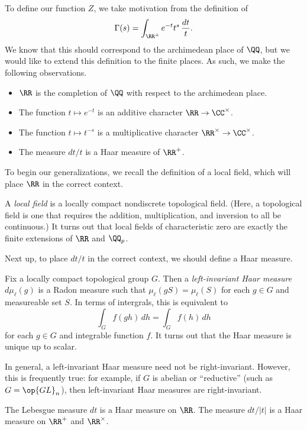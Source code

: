 \documentclass{article}
\begin{document}
To define our function $Z$, we take motivation from the definition of
\[\Gamma(s)=\int_{\RR^+}e^{-t}t^s\,\frac{dt}t.\]
We know that this should correspond to the archimedean place of $\QQ$, but we would like to extend this definition to the finite places. As such, we make the following observations.
\begin{itemize}
	\item $\RR$ is the completion of $\QQ$ with respect to the archimedean place.
	\item The function $t\mapsto e^{-t}$ is an additive character $\RR\to\CC^\times$.
	\item The function $t\mapsto t^{-s}$ is a multiplicative character $\RR^\times\to\CC^\times$.
	\item The measure $dt/t$ is a Haar measure of $\RR^+$.
\end{itemize}
To begin our generalizations, we recall the definition of a local field, which will place $\RR$ in the correct context.
\begin{definition}
	A \textit{local field} is a locally compact nondiscrete topological field. (Here, a topological field is one that requires the addition, multiplication, and inversion to all be continuous.) It turns out that local fields of characteristic zero are exactly the finite extensions of $\RR$ and $\QQ_p$.
\end{definition}
Next up, to place $dt/t$ in the correct context, we should define a Haar measure.
\begin{definition}
	Fix a locally compact topological group $G$. Then a \textit{left-invariant Haar measure} $d\mu_\ell(g)$ is a Radon measure such that $\mu_\ell(gS)=\mu_\ell(S)$ for each $g\in G$ and measureable set $S$. In terms of intergrals, this is equivalent to
	\[\int_Gf(gh)\,dh=\int_Gf(h)\,dh\]
	for each $g\in G$ and integrable function $f$. It turns out that the Haar measure is unique up to scalar.
\end{definition}
\begin{remark}
	In general, a left-invariant Haar measure need not be right-invariant. However, this is frequently true: for example, if $G$ is abelian or ``reductive'' (such as $G=\op{GL}_n$), then left-invariant Haar measures are right-invariant.
\end{remark}
\begin{example}
	The Lebesgue measure $dt$ is a Haar measure on $\RR$. The measure $dt/\left|t\right|$ is a Haar measure on $\RR^+$ and $\RR^\times$.
\end{example}
\end{document}
